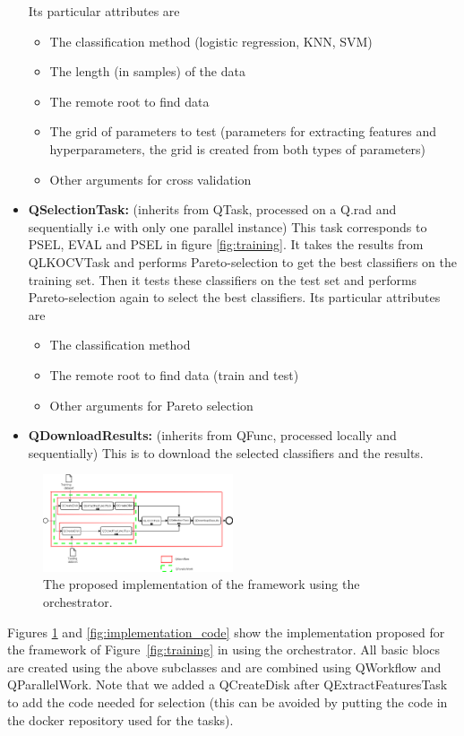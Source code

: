 \documentclass[10pt, conference, compsocconf]{IEEEtran}
\begin{document}
\begin{itemize}
  Its particular attributes are
  \begin{itemize}
  \item The classification method (logistic regression, KNN, SVM)
  \item The length (in samples) of the data
  \item The remote root to find data
  \item The grid of parameters to test (parameters for extracting features and hyperparameters, the grid is created from both types of parameters)
  \item Other arguments for cross validation
  \end{itemize}
\item \textbf{QSelectionTask:} (inherits from QTask, processed on a Q.rad and sequentially i.e with only one parallel instance) This task corresponds to PSEL, EVAL and PSEL in figure \ref{fig:training}. It takes the results from QLKOCVTask and performs Pareto-selection to get the best classifiers on the training set. Then it tests these classifiers on the test set and performs Pareto-selection again to select the best classifiers.
  Its particular attributes are
  \begin{itemize}
  \item The classification method
  \item The remote root to find data (train and test)
  \item Other arguments for Pareto selection
  \end{itemize}
\item \textbf{QDownloadResults:} (inherits from QFunc, processed locally and sequentially) This is to download the selected classifiers and the results.
\end{itemize}
\begin{figure}[H]
\centering
\includegraphics[width=0.5\textwidth]{Figures/implementation.png}
\caption{The proposed implementation of the framework using the orchestrator.}
\label{fig:implementation_diagram}
\end{figure}

Figures \ref{fig:implementation_diagram} and \ref{fig:implementation_code} show the implementation proposed for the framework of Figure~\ref{fig:training} in using the orchestrator. All basic blocs are created using the above subclasses and are combined using QWorkflow and QParallelWork. Note that we added a QCreateDisk after QExtractFeaturesTask to add the code needed for selection (this can be avoided by putting the code in the docker repository used for the tasks).
\end{document}
